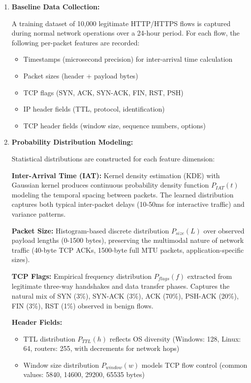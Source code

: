 \begin{enumerate}
    \item \textbf{Baseline Data Collection:}
    
    A training dataset of 10,000 legitimate HTTP/HTTPS flows is captured during normal network operations over a 24-hour period. For each flow, the following per-packet features are recorded:
    \begin{itemize}
        \item Timestamps (microsecond precision) for inter-arrival time calculation
        \item Packet sizes (header + payload bytes)
        \item TCP flags (SYN, ACK, SYN-ACK, FIN, RST, PSH)
        \item IP header fields (TTL, protocol, identification)
        \item TCP header fields (window size, sequence numbers, options)
    \end{itemize}
    
    \item \textbf{Probability Distribution Modeling:}
    
    Statistical distributions are constructed for each feature dimension:
    
    \textbf{Inter-Arrival Time (IAT):} Kernel density estimation (KDE) with Gaussian kernel produces continuous probability density function $P_{IAT}(t)$ modeling the temporal spacing between packets. The learned distribution captures both typical inter-packet delays (10-50ms for interactive traffic) and variance patterns.
    
    \textbf{Packet Size:} Histogram-based discrete distribution $P_{size}(L)$ over observed payload lengths (0-1500 bytes), preserving the multimodal nature of network traffic (40-byte TCP ACKs, 1500-byte full MTU packets, application-specific sizes).
    
    \textbf{TCP Flags:} Empirical frequency distribution $P_{flags}(f)$ extracted from legitimate three-way handshakes and data transfer phases. Captures the natural mix of SYN (3\%), SYN-ACK (3\%), ACK (70\%), PSH-ACK (20\%), FIN (3\%), RST (1\%) observed in benign flows.
    
    \textbf{Header Fields:} 
    \begin{itemize}
        \item TTL distribution $P_{TTL}(h)$ reflects OS diversity (Windows: 128, Linux: 64, routers: 255, with decrements for network hops)
        \item Window size distribution $P_{window}(w)$ models TCP flow control (common values: 5840, 14600, 29200, 65535 bytes)
    \end{itemize}
    

\end{enumerate}

